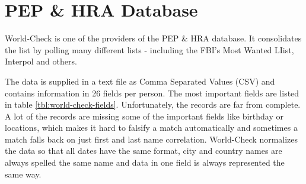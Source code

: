 \documentclass[a4paper, oneside]{csthesis}
\begin{document}










\section{PEP \& HRA Database}


World-Check \cite{website:world-check} is one of the providers of the PEP \& HRA database. It consolidates the list by polling many different lists - including the FBI's Most Wanted LIist, Interpol and others.

The data is supplied in a text file as Comma Separated Values (CSV) and contains information in 26 fields per person. The most important fields are listed in table \ref{tbl:world-check-fields}. Unfortunately, the records are far from complete. A lot of the records are missing some of the important fields like birthday or locations, which makes it hard to falsify a match automatically and sometimes a match falls back on just first and last name correlation. World-Check normalizes the data so that all dates have the same format, city and country names are always spelled the same name and data in one field is always represented the same way.
\end{document}
